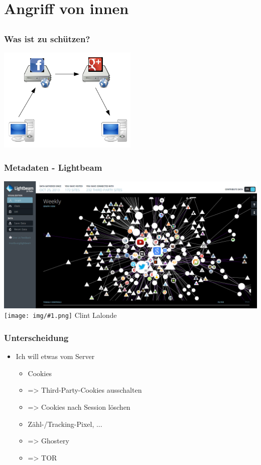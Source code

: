 \documentclass[12pt]{beamer}
\newcommand{\cc}[1]{\texttt{[image: img/\#1.png]}\hspace{1mm}}
\begin{document}
\section{Angriff von innen}
\subsection{}

\begin{frame}
    \frametitle{Was ist zu schützen?}
    \begin{center}
      \includegraphics[height=5cm]{img/fed-social.png}
    \end{center}
\end{frame}

\begin{frame}
    \frametitle{Metadaten - Lightbeam}
    \includegraphics[height=0.7\textheight]{img/lightbeam.png}
    \\{\small \cc{by-sa} Clint Lalonde}
\end{frame}

\begin{frame}
    \frametitle{Unterscheidung}
    \begin{itemize}
      \item<2-> Ich will etwas vom Server
        \begin{itemize}
          \item<3-> Cookies
          \item<4-> => Third-Party-Cookies ausschalten
          \item<5-> => Cookies nach Session löschen
          \item<6-> Zähl-/Tracking-Pixel, ...
          \item<7-> => Ghostery
          \item<8-> => TOR
        \end{itemize}
    \end{itemize}
\end{frame}
\end{document}
